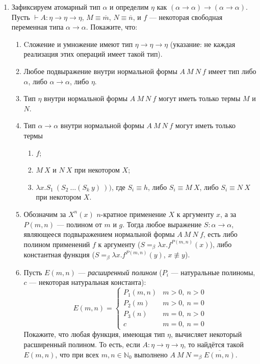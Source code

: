 \documentclass[10pt,a4paper,oneside]{article}
\begin{document}
\begin{enumerate}
\item Зафиксируем атомарный тип $\alpha$ и определим $\eta$ как $(\alpha\rightarrow\alpha)\rightarrow(\alpha\rightarrow\alpha)$.
Пусть $\vdash A:\eta\rightarrow\eta\rightarrow\eta$, $M\equiv\overline{m}$, $N\equiv\overline{n}$, и $f$ --- некоторая
свободная переменная типа $\alpha\rightarrow\alpha$.
Покажите, что:
\begin{enumerate}
\item Cложение и умножение имеют тип $\eta\rightarrow\eta\rightarrow\eta$ (указание: не каждая реализация этих операций имеет такой тип).
\item Любое подвыражение внутри нормальной формы $A\ M\ N\ f$ имеет тип либо $\alpha$, либо $\alpha\rightarrow\alpha$, либо $\eta$.
\item Тип $\eta$ внутри нормальной формы $A\ M\ N\ f$ могут иметь только термы $M$ и $N$.
\item Тип $\alpha\rightarrow\alpha$ внутри нормальной формы $A\ M\ N\ f$ могут иметь только термы 
\begin{enumerate}\item $f$; \item $M\ X$ и $N\ X$ при некотором $X$;
\item $\lambda x.S_1\ (S_2\ \dots (S_k\ y)\ ))$, где $S_i \equiv h$, либо $S_i \equiv M\ X$, либо $S_i \equiv N\ X$ при некотором $X$.\end{enumerate}
\item Обозначим за $X^n(x)$ $n$-кратное применение $X$ к аргументу $x$, а за $P(m,n)$ --- полином от $m$ и $g$.
Тогда любое выражение $S: \alpha\rightarrow\alpha$, являющееся подвыражением нормальной формы $A\ M\ N\ f$, есть либо полином применений $f$
к аргументу ($S =_\beta \lambda x.f^{P(m,n)}(x)$), либо константная функция ($S =_\beta \lambda x.f^{P(m,n)}(y)$, $x \not\equiv y$).
\item Пусть $E(m,n)$ --- \emph{расширенный полином} ($P_i$ --- натуральные полиномы, $c$ --- некоторая натуральная константа):
$$E(m,n) = \left\{\begin{array}{ll}P_1(m,n)&m > 0,\ n > 0\\P_2(m)&m > 0,\ n =0\\P_3(n)&m = 0,\ n > 0\\c&m = 0,\ n = 0\end{array}\right.$$
Покажите, что любая функция, имеющая тип $\eta$, вычисляет некоторый расширенный полином.
То есть, если $A:\eta\rightarrow\eta\rightarrow\eta$, то найдётся такой $E(m,n)$, что при всех $m,n \in \mathbb{N}_0$ выполнено
$A\ M\ N =_\beta \overline{E(m,n)}$.
\end{enumerate}

\end{enumerate}
\end{document}
